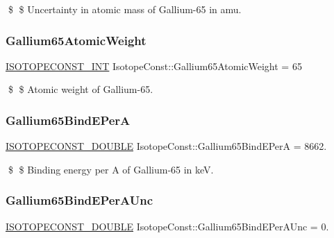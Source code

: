 \$ \$ Uncertainty in atomic mass of Gallium-\/65 in amu. \mbox{\label{group___isotope_const-_gallium-_ga65_ga9e7add866225e4d2f38745afddb36105}} 
\subsubsection{\texorpdfstring{Gallium65\+Atomic\+Weight}{Gallium65AtomicWeight}}
{\footnotesize\ttfamily \mbox{\hyperlink{group___isotope_const-_macros_ga5f18360b3e99483a35c32d789e62621c}{I\+S\+O\+T\+O\+P\+E\+C\+O\+N\+S\+T\+\_\+\+I\+NT}} Isotope\+Const\+::\+Gallium65\+Atomic\+Weight = 65}

\$ \$ Atomic weight of Gallium-\/65. \mbox{\label{group___isotope_const-_gallium-_ga65_gab2c39b09ee20eac63a8972c81c6a14fe}} 
\subsubsection{\texorpdfstring{Gallium65\+Bind\+E\+PerA}{Gallium65BindEPerA}}
{\footnotesize\ttfamily \mbox{\hyperlink{group___isotope_const-_macros_ga8f45a7272ce02c0b4c65c44636ed719a}{I\+S\+O\+T\+O\+P\+E\+C\+O\+N\+S\+T\+\_\+\+D\+O\+U\+B\+LE}} Isotope\+Const\+::\+Gallium65\+Bind\+E\+PerA = 8662.}

\$ \$ Binding energy per A of Gallium-\/65 in keV. \mbox{\label{group___isotope_const-_gallium-_ga65_ga072f4e5b2d2b4ead64bb5e3b474438e5}} 
\subsubsection{\texorpdfstring{Gallium65\+Bind\+E\+Per\+A\+Unc}{Gallium65BindEPerAUnc}}
{\footnotesize\ttfamily \mbox{\hyperlink{group___isotope_const-_macros_ga8f45a7272ce02c0b4c65c44636ed719a}{I\+S\+O\+T\+O\+P\+E\+C\+O\+N\+S\+T\+\_\+\+D\+O\+U\+B\+LE}} Isotope\+Const\+::\+Gallium65\+Bind\+E\+Per\+A\+Unc = 0.}


